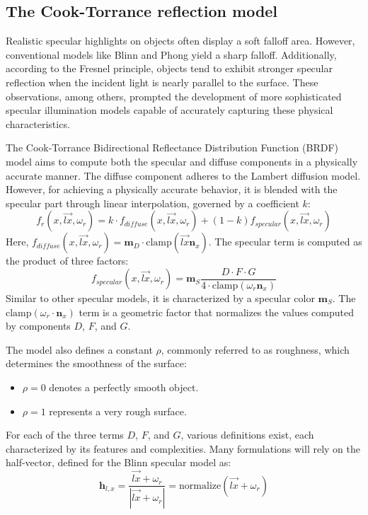 \subsection{The Cook-Torrance reflection model}
Realistic specular highlights on objects often display a soft falloff area. However, conventional models like Blinn and Phong yield a sharp falloff. 
Additionally, according to the Fresnel principle, objects tend to exhibit stronger specular reflection when the incident light is nearly parallel to the surface. 
These observations, among others, prompted the development of more sophisticated specular illumination models capable of accurately capturing these physical characteristics.

The Cook-Torrance Bidirectional Reflectance Distribution Function (BRDF) model aims to compute both the specular and diffuse components in a physically accurate manner.
The diffuse component adheres to the Lambert diffusion model. 
However, for achieving a physically accurate behavior, it is blended with the specular part through linear interpolation, governed by a coefficient $k$:
\[f_r(x,\overrightarrow{lx},\omega_r)=k\cdot f_{diffuse}(x,\overrightarrow{lx},\omega_r)+(1-k)f_{specular}(x,\overrightarrow{lx},\omega_r)\]
Here, $f_{diffuse}(x,\overrightarrow{lx},\omega_r)=\mathbf{m}_D\cdot\text{clamp}(\overrightarrow{lx}\mathbf{n}_x)$. 
The specular term is computed as the product of three factors:
\[f_{specular}(x,\overrightarrow{lx},\omega_r)=\mathbf{m}_S\dfrac{D\cdot F\cdot G}{4\cdot\text{clamp}(\omega_r\mathbf{n}_x)}\]
Similar to other specular models, it is characterized by a specular color $\mathbf{m}_S$. 
The $\text{clamp}(\omega_r\cdot\mathbf{n}_x)$ term is a geometric factor that normalizes the values computed by components $D$, $F$, and $G$.

The model also defines a constant $\rho$, commonly referred to as roughness, which determines the smoothness of the surface:
\begin{itemize}
    \item $\rho=0$ denotes a perfectly smooth object.
    \item $\rho=1$ represents a very rough surface.
\end{itemize}
For each of the three terms $D$, $F$, and $G$, various definitions exist, each characterized by its features and complexities. 
Many formulations will rely on the half-vector, defined for the Blinn specular model as:
\[\mathbf{h}_{l,x}=\dfrac{\overrightarrow{lx}+\omega_r}{\left\lvert \overrightarrow{lx}+\omega_r\right\rvert }=\text{normalize}(\overrightarrow{lx}+\omega_r)\]

